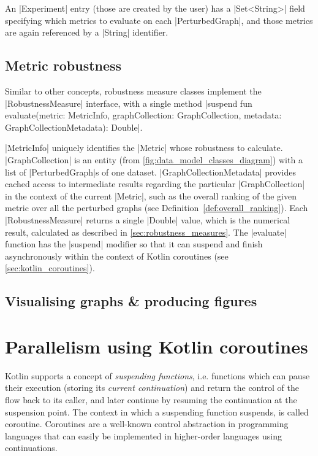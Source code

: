 An |Experiment| entry (those are created by the user) has a |Set<String>| field specifying which metrics to evaluate on each |PerturbedGraph|, and those metrics are again referenced by a |String| identifier.

\subsection{Metric robustness}

Similar to other concepts, robustness measure classes implement the |RobustnessMeasure| interface, with a single method |suspend fun evaluate(metric: MetricInfo, graphCollection: GraphCollection, metadata: GraphCollectionMetadata): Double|.

|MetricInfo| uniquely identifies the |Metric| whose robustness to calculate.
|GraphCollection| is an entity (from \autoref{fig:data_model_classes_diagram}) with a list of |PerturbedGraph|s of one dataset.
|GraphCollectionMetadata| provides cached\footnotemark{} access to intermediate results regarding the particular |GraphCollection| in the context of the current |Metric|, such as the overall ranking of the given metric over all the perturbed graphs (see Definition~\ref{def:overall_ranking}).
Each |RobustnessMeasure| returns a single |Double| value, which is the numerical result, calculated as described in \autoref{sec:robustness_measures}.
The |evaluate| function has the |suspend| modifier so that it can suspend and finish asynchronously within the context of Kotlin coroutines (see \autoref{sec:kotlin_coroutines}).

\subsection{Visualising graphs \& producing figures}



\section{Parallelism using Kotlin coroutines}
\label{sec:kotlin_coroutines}

Kotlin supports a concept of \textsl{suspending functions}, i.e. functions which can pause their execution (storing its \textsl{current continuation}) and return the control of the flow back to its caller, and later continue by resuming the continuation at the suspension point.
The context in which a suspending function suspends, is called coroutine.
Coroutines are a well-known control abstraction in programming languages\cite{MouraRevisitingCoroutines2009} that can easily be implemented in higher-order languages using continuations\cite{HaynesContinuationsCoroutines1984}.

